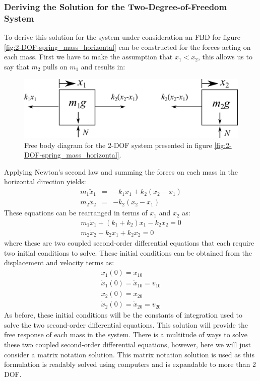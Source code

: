 \documentclass[12pt,letter]{article}
\begin{document}
	\subsubsection{Deriving the Solution for the Two-Degree-of-Freedom System}
	\label{sec:2-DOF_derive_solution}
	To derive this solution for the system under consideration an FBD for figure \ref{fig:2-DOF-spring_mass_horizontal} can be constructed for the forces acting on each mass. First we have to make the assumption that $x_1 < x_2$, this allows us to say that $m_2$ pulls on $m_1$ and results in:
	\begin{figure}[H]
		\centering
		\includegraphics[]{../figures/2-DOF-spring_mass_horizontal_FBD.png}
		\caption{Free body diagram for the 2-DOF system presented in figure \ref{fig:2-DOF-spring_mass_horizontal}.}
		\label{fig:2-DOF-spring_mass_horizontal_FBD}
	\end{figure}
	\noindent Applying Newton's second law and summing the forces on each mass in the horizontal direction yields:
	\begin{eqnarray}
	m_1\ddot{x}_1 &= & -k_1x_1 + k_2(x_2-x_1) \\
	m_2\ddot{x}_2&= & -k_2(x_2-x_1)  \nonumber
	\end{eqnarray}
	These equations can be rearranged in terms of  $x_1$ and $x_2$ as:
	\begin{eqnarray}
	m_1\ddot{x}_1 +(k_1+k_2)x_1 -k_2x_2 =0 \\
	m_2\ddot{x}_2 - k_2x_1 + k_2x_2 = 0 \nonumber
	\end{eqnarray}
	where these are two coupled second-order differential equations that each require two initial conditions to solve. These initial conditions can be obtained from the displacement and velocity terms as:
	\begin{eqnarray}
	x_1(0) = x_{10} \\
	\dot{x}_1(0) = \dot{x}_{10} = v_{10} \nonumber \\ 
	x_2(0) = x_{20} \nonumber \\ 
	\dot{x}_2(0) = \dot{x}_{20} = v_{20} \nonumber
	\end{eqnarray}
	As before, these initial conditions will be the constants of integration used to solve the two second-order differential equations. This solution will provide the free response of each mass in the system. There is a multitude of ways to solve these two coupled second-order differential equations, however, here we will just consider a matrix notation solution. This matrix notation solution is used as this formulation is readably solved using computers and is expandable to more than 2 DOF.
	
\end{document}

